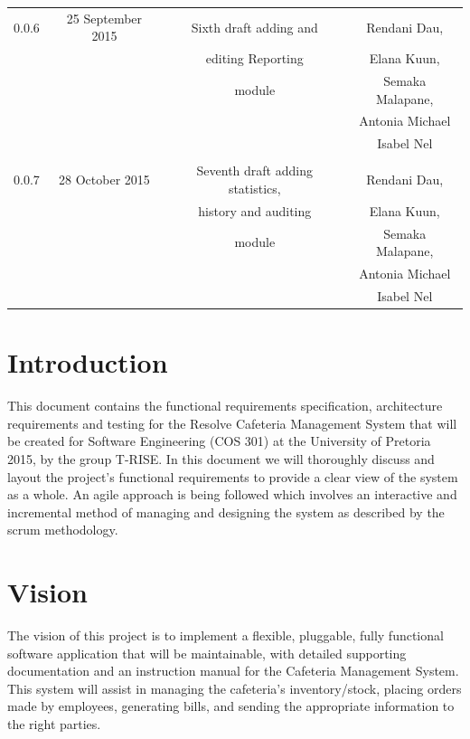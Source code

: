 \documentclass[a4paper,12pt]{report}
\begin{document}
\begin{table}[h!]
\begin{tabular}{||c c c c||}
 0.0.6 & 25 September 2015 &  Sixth draft adding and & Rendani Dau, \\ & & editing Reporting  & Elana Kuun, \\ & & module  & Semaka Malapane, \\ & & &  Antonia Michael \\ & & & Isabel Nel \\   [1ex] 
\hline
& & & \\
 0.0.7 & 28 October 2015 &  Seventh draft adding statistics, & Rendani Dau, \\ & & history and auditing & Elana Kuun, \\ & & module  & Semaka Malapane, \\ & & &  Antonia Michael \\ & & & Isabel Nel \\   [1ex] 
\hline
 \end{tabular}
\end{table}

\pagebreak




\section{Introduction}
This document contains the functional requirements specification, architecture requirements and testing for the Resolve Cafeteria Management System that will be created for Software Engineering (COS 301) at the University of Pretoria 2015, by the group T-RISE. In this document we will thoroughly discuss and layout the project's functional requirements to provide a clear view of the system as a whole. An agile approach is being followed which involves an interactive and incremental method of managing and designing the system as described by the scrum methodology.
\section{Vision}
The vision of this project is to implement a flexible, pluggable, fully functional software application that will be maintainable, with detailed supporting documentation and an instruction manual for the Cafeteria Management System. This system will assist in managing the cafeteria's inventory/stock, placing orders made by employees, generating bills, and sending the appropriate information to the right parties.  
\end{document}
